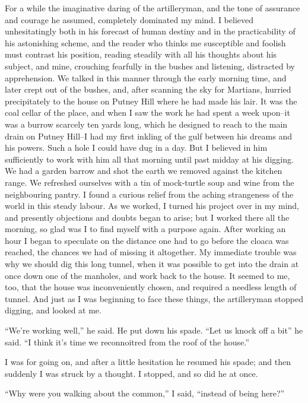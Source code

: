 For a while the imaginative daring of the artilleryman, and the
tone of assurance and courage he assumed, completely dominated my
mind. I believed unhesitatingly both in his forecast of human
destiny and in the practicability of his astonishing scheme, and
the reader who thinks me susceptible and foolish must contrast his
position, reading steadily with all his thoughts about his subject,
and mine, crouching fearfully in the bushes and listening,
distracted by apprehension. We talked in this manner through the
early morning time, and later crept out of the bushes, and, after
scanning the sky for Martians, hurried precipitately to the house
on Putney Hill where he had made his lair. It was the coal cellar
of the place, and when I saw the work he had spent a week upon--it
was a burrow scarcely ten yards long, which he designed to reach to
the main drain on Putney Hill--I had my first inkling of the gulf
between his dreams and his powers. Such a hole I could have dug in
a day. But I believed in him sufficiently to work with him all that
morning until past midday at his digging. We had a garden barrow
and shot the earth we removed against the kitchen range. We
refreshed ourselves with a tin of mock-turtle soup and wine from
the neighbouring pantry. I found a curious relief from the aching
strangeness of the world in this steady labour. As we worked, I
turned his project over in my mind, and presently objections and
doubts began to arise; but I worked there all the morning, so glad
was I to find myself with a purpose again. After working an hour I
began to speculate on the distance one had to go before the cloaca
was reached, the chances we had of missing it altogether. My
immediate trouble was why we should dig this long tunnel, when it
was possible to get into the drain at once down one of the
manholes, and work back to the house. It seemed to me, too, that
the house was inconveniently chosen, and required a needless length
of tunnel. And just as I was beginning to face these things, the
artilleryman stopped digging, and looked at me.

``We're working well,'' he said. He put down his spade. ``Let us knock
off a bit'' he said. ``I think it's time we reconnoitred from the
roof of the house.''

I was for going on, and after a little hesitation he resumed his
spade; and then suddenly I was struck by a thought. I stopped, and
so did he at once.

``Why were you walking about the common,'' I said, ``instead of being
here?''


